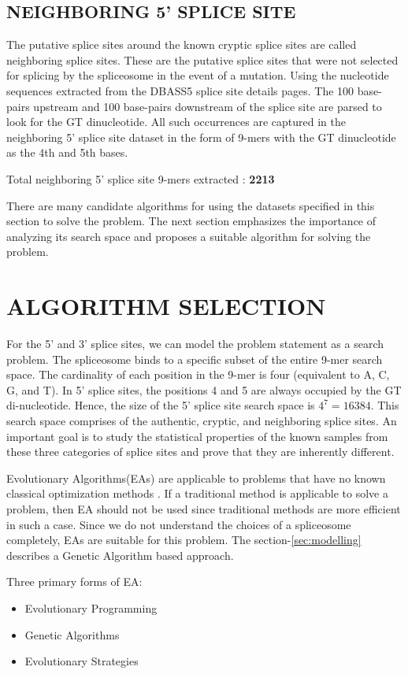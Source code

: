 \documentclass[12pt,a4paper]{article}
\begin{document}
	\subsection{NEIGHBORING 5' SPLICE SITE}
	The putative splice sites around the known cryptic splice sites are called neighboring splice sites. These are the putative splice sites that were not selected for splicing by the spliceosome in the event of a mutation. Using the nucleotide sequences extracted from the DBASS5 splice site details pages. The 100 base-pairs upstream and 100 base-pairs downstream of the splice site are parsed to look for the GT dinucleotide. All such occurrences are captured in the neighboring 5’ splice site dataset in the form of 9-mers with the GT dinucleotide as the 4th and 5th bases.\par
	
	Total neighboring 5’ splice site 9-mers extracted : \textbf{2213} \par
	
	There are many candidate algorithms for using the datasets specified in this section to solve the problem. The next section emphasizes the importance of analyzing its search space and proposes a suitable algorithm for solving the problem.
	
	\section{ALGORITHM SELECTION}
	For the 5’ and 3' splice sites, we can model the problem statement as a search problem. The spliceosome binds to a specific subset of the entire 9-mer search space. The cardinality of each position in the 9-mer is four (equivalent to A, C, G, and T). In 5' splice sites, the positions 4 and 5 are always occupied by the GT di-nucleotide. Hence, the size of the 5' splice site search space is $ 4^{7} = 16384 $. This search space comprises of the authentic, cryptic, and neighboring splice sites. An important goal is to study the statistical properties of the known samples from these three categories of splice sites and prove that they are inherently different. \par
	Evolutionary Algorithms(EAs) are applicable to problems that have no known classical optimization methods \cite{handbook}. If a traditional method is applicable to solve a problem, then EA should not be used since traditional methods are more efficient in such a case. Since we do not understand the choices of a spliceosome completely, EAs are suitable for this problem. The section-\ref{sec:modelling} describes a Genetic Algorithm based approach.\par
	Three primary forms of EA:
	\begin{itemize}
	\item Evolutionary Programming
	\item Genetic Algorithms
	\item Evolutionary Strategies
	\end{itemize}
	
\end{document}
